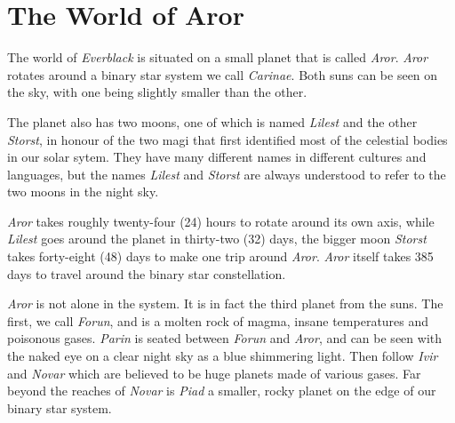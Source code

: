 \chapter{The World of Aror}
\label{sec:Aror}

The world of \emph{Everblack} is situated on a small planet that is
called \emph{Aror}. \emph{Aror} rotates around a binary star system we
call \emph{Carinae}. Both suns can be seen on the sky, with one being
slightly smaller than the other.

The planet also has two moons, one of which is named \emph{Lilest} and
the other \emph{Storst}, in honour of the two magi that first
identified most of the celestial bodies in our solar sytem. They have
many different names in different cultures and languages, but the
names \emph{Lilest} and \emph{Storst} are always understood to refer
to the two moons in the night sky.

\emph{Aror} takes roughly twenty-four (24) hours to rotate around its
own axis, while \emph{Lilest} goes around the planet in thirty-two
(32) days, the bigger moon \emph{Storst} takes forty-eight (48) days
to make one trip around \emph{Aror}. \emph{Aror} itself takes 385 days
to travel around the binary star constellation.

\emph{Aror} is not alone in the system. It is in fact the third planet
from the suns. The first, we call \emph{Forun}, and is a molten rock
of magma, insane temperatures and poisonous gases. \emph{Parin} is
seated between \emph{Forun} and \emph{Aror}, and can be seen with the
naked eye on a clear night sky as a blue shimmering light. Then follow
\emph{Ivir} and \emph{Novar} which are believed to be huge planets made
of various gases. Far beyond the reaches of \emph{Novar} is
\emph{Piad} a smaller, rocky planet on the edge of our binary star
system.



%
\newpage

\newpage











